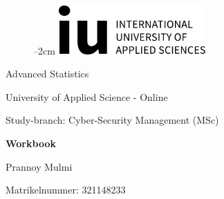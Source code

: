 
\label{titlePage}
\begin{figure}[h]
\centering
\advance\leftskip--2cm
\includegraphics[width=0.50\textwidth]{pics/logo.pdf}
\end{figure}
\FloatBarrier

\begin{Large} 
\begin{center}
Advanced Statistics
\end{center}
\end{Large} 

\vspace*{5mm}

\begin{large} 
\begin{center}
University of Applied Science - Online
\end{center}
\end{large} 

\begin{large} 
\begin{center}
Study-branch: Cyber-Security Management (MSc) 
\end{center}
\end{large}

\vspace*{15mm}

\begin{Large} 
\begin{center}
\textbf{Workbook}
\end{center}
\end{Large}

\vspace*{15mm}

\begin{large} 
\begin{center}
Prannoy Mulmi
\end{center}
\end{large} 

\vspace*{-6mm}

\begin{large} 
\begin{center}
Matrikelnummer: 321148233
\end{center}
\end{large} 

